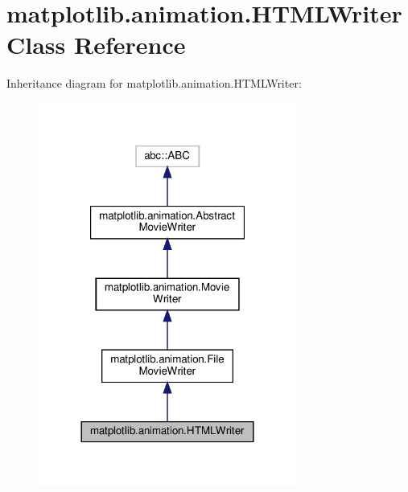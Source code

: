 \hypertarget{classmatplotlib_1_1animation_1_1HTMLWriter}{}\section{matplotlib.\+animation.\+H\+T\+M\+L\+Writer Class Reference}
\label{classmatplotlib_1_1animation_1_1HTMLWriter}


Inheritance diagram for matplotlib.\+animation.\+H\+T\+M\+L\+Writer\+:
\nopagebreak
\begin{figure}[H]
\begin{center}
\leavevmode
\includegraphics[width=240pt]{classmatplotlib_1_1animation_1_1HTMLWriter__inherit__graph}
\end{center}
\end{figure}



